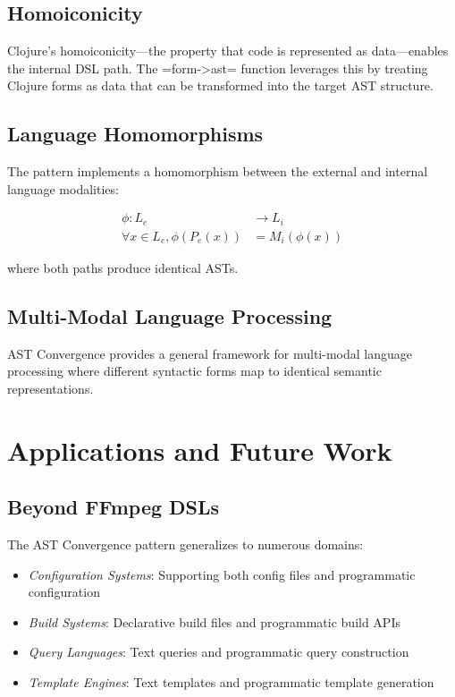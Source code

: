 \documentclass[conference]{IEEEtran}
\begin{document}
\subsection{Homoiconicity}

Clojure's homoiconicity---the property that code is represented as data---enables the internal DSL path. The =form->ast= function leverages this by treating Clojure forms as data that can be transformed into the target AST structure.

\subsection{Language Homomorphisms}

The pattern implements a homomorphism between the external and internal language modalities:

\begin{align*}
\phi: L_e &\rightarrow L_i\\
\forall x \in L_e, \phi(P_e(x)) &= M_i(\phi(x))
\end{align*}

where both paths produce identical ASTs.

\subsection{Multi-Modal Language Processing}

AST Convergence provides a general framework for multi-modal language processing where different syntactic forms map to identical semantic representations.

\section{Applications and Future Work}

\subsection{Beyond FFmpeg DSLs}

The AST Convergence pattern generalizes to numerous domains:

\begin{itemize}
\item \emph{Configuration Systems}: Supporting both config files and programmatic configuration
\item \emph{Build Systems}: Declarative build files and programmatic build APIs
\item \emph{Query Languages}: Text queries and programmatic query construction
\item \emph{Template Engines}: Text templates and programmatic template generation
\end{itemize}
\end{document}
